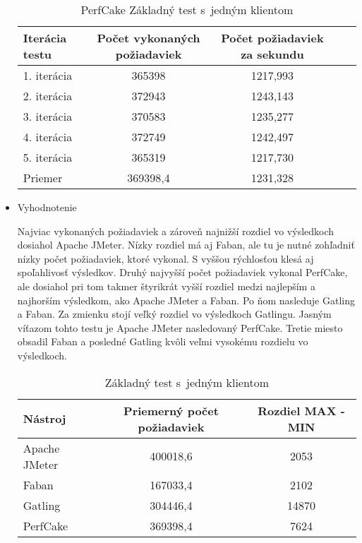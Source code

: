 \documentclass[12pt,oneside,final]{fithesis-utf8}
\begin{document}
\begin{itemize}
\begin{table}[H]
\begin{center}
\begin{tabular}{ | l | c | c | c | c |}
		\hline
		 \textbf{Iterácia testu} & \textbf{Počet vykonaných požiadaviek} & \textbf{Počet požiadaviek za sekundu} \\ \hline
		 1. iterácia & 365398 & 1217,993 \\ \hline
		 2. iterácia & 372943 & 1243,143 \\ \hline
		 3. iterácia & 370583 & 1235,277 \\ \hline
		 4. iterácia & 372749 & 1242,497 \\ \hline
		 5. iterácia & 365319 & 1217,730 \\ \hline
		 Priemer & 369398,4 & 1231,328 \\ \hline
		 
\end{tabular}
\end{center}
\caption{PerfCake Základný test s~jedným klientom}
\end{table}

\item Vyhodnotenie

Najviac vykonaných požiadaviek a zároveň najnižší rozdiel vo výsledkoch dosiahol Apache JMeter. Nízky rozdiel má aj Faban, ale  tu je nutné zohľadniť nízky počet požiadaviek, ktoré vykonal. S vyššou rýchlosťou klesá aj spoľahlivosť výsledkov. Druhý najvyšší počet požiadaviek vykonal PerfCake, ale dosiahol pri tom takmer štyrikrát vyšší rozdiel medzi najlepším a najhorším výsledkom, ako Apache JMeter a Faban. Po ňom nasleduje Gatling a Faban. Za zmienku stojí veľký rozdiel vo výsledkoch Gatlingu. Jasným víťazom tohto testu je Apache JMeter nasledovaný PerfCake. Tretie miesto obsadil Faban a posledné Gatling kvôli veľmi vysokému rozdielu vo výsledkoch.

\begin{table}[H]
\begin{center}
\begin{tabular}{ | l | c | c |}
		\hline
		 \textbf{Nástroj} & \textbf{Priemerný počet požiadaviek} & \textbf{Rozdiel MAX - MIN} \\ \hline
		 Apache JMeter & 400018,6 & 2053 \\ \hline
		 Faban & 167033,4 & 2102 \\ \hline
		 Gatling & 304446,4 & 14870 \\ \hline
		 PerfCake & 369398,4 & 7624 \\ \hline
\end{tabular}
\end{center}
\caption{Základný test s~jedným klientom}
\end{table}

\end{itemize}
\end{document}
